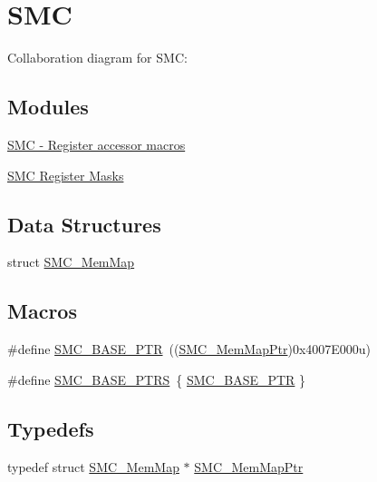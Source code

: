 \hypertarget{group___s_m_c___peripheral}{}\section{S\+MC}
\label{group___s_m_c___peripheral}
Collaboration diagram for S\+MC\+:
\subsection*{Modules}
\begin{DoxyCompactItemize}
\item 
\hyperlink{group___s_m_c___register___accessor___macros}{S\+M\+C -\/ Register accessor macros}
\item 
\hyperlink{group___s_m_c___register___masks}{S\+M\+C Register Masks}
\end{DoxyCompactItemize}
\subsection*{Data Structures}
\begin{DoxyCompactItemize}
\item 
struct \hyperlink{struct_s_m_c___mem_map}{S\+M\+C\+\_\+\+Mem\+Map}
\end{DoxyCompactItemize}
\subsection*{Macros}
\begin{DoxyCompactItemize}
\item 
\#define \hyperlink{group___s_m_c___peripheral_ga31b6c4571795341e6446800243313e56}{S\+M\+C\+\_\+\+B\+A\+S\+E\+\_\+\+P\+TR}~((\hyperlink{group___s_m_c___peripheral_ga763f87a6b8ebab7acb6dde639e6a47c7}{S\+M\+C\+\_\+\+Mem\+Map\+Ptr})0x4007\+E000u)
\item 
\#define \hyperlink{group___s_m_c___peripheral_gae583f3f0917ee513adcac36dd042a5f3}{S\+M\+C\+\_\+\+B\+A\+S\+E\+\_\+\+P\+T\+RS}~\{ \hyperlink{group___s_m_c___peripheral_ga31b6c4571795341e6446800243313e56}{S\+M\+C\+\_\+\+B\+A\+S\+E\+\_\+\+P\+TR} \}
\end{DoxyCompactItemize}
\subsection*{Typedefs}
\begin{DoxyCompactItemize}
\item 
typedef struct \hyperlink{struct_s_m_c___mem_map}{S\+M\+C\+\_\+\+Mem\+Map} $\ast$ \hyperlink{group___s_m_c___peripheral_ga763f87a6b8ebab7acb6dde639e6a47c7}{S\+M\+C\+\_\+\+Mem\+Map\+Ptr}
\end{DoxyCompactItemize}


